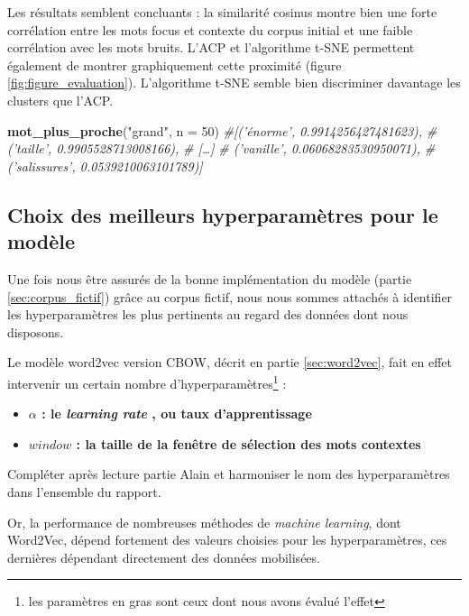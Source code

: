 \documentclass[11pt,french,french]{article}
\newenvironment{Shaded}{\begin{snugshade}}{\end{snugshade}}
\newcommand{\CommentTok}[1]{\textcolor[rgb]{0.56,0.35,0.01}{\textit{#1}}}
\newcommand{\DataTypeTok}[1]{\textcolor[rgb]{0.13,0.29,0.53}{#1}}
\newcommand{\DecValTok}[1]{\textcolor[rgb]{0.00,0.00,0.81}{#1}}
\newcommand{\KeywordTok}[1]{\textcolor[rgb]{0.13,0.29,0.53}{\textbf{#1}}}
\newcommand{\NormalTok}[1]{#1}
\newcommand{\StringTok}[1]{\textcolor[rgb]{0.31,0.60,0.02}{#1}}
\let\rmarkdownfootnote\footnote%
\def\footnote{\protect\rmarkdownfootnote}
\begin{document}
Les résultats semblent concluants : la similarité cosinus montre bien
une forte corrélation entre les mots focus et contexte du corpus initial
et une faible corrélation avec les mots bruits. L'ACP et l'algorithme
t-SNE permettent également de montrer graphiquement cette proximité
(figure \ref{fig:figure_evaluation}). L'algorithme t-SNE semble bien
discriminer davantage les clusters que l'ACP.

\begin{Shaded}
\begin{Highlighting}[]
\KeywordTok{mot_plus_proche}\NormalTok{(}\StringTok{"grand"}\NormalTok{, }\DataTypeTok{n =} \DecValTok{50}\NormalTok{)}
\CommentTok{#[('énorme', 0.9914256427481623),}
\CommentTok{# ('taille', 0.9905528713008166),}
\CommentTok{# […]}
\CommentTok{# ('vanille', 0.06068283530950071),}
\CommentTok{# ('salissures', 0.0539210063101789)]}
\end{Highlighting}
\end{Shaded}

\hypertarget{choix-des-meilleurs-hyperparamuxe8tres-pour-le-moduxe8le}{%
\subsection{Choix des meilleurs hyperparamètres pour le
modèle}\label{choix-des-meilleurs-hyperparamuxe8tres-pour-le-moduxe8le}}

Une fois nous être assurés de la bonne implémentation du modèle (partie
\ref{sec:corpus_fictif}) grâce au corpus fictif, nous nous sommes
attachés à identifier les hyperparamètres les plus pertinents au regard
des données dont nous disposons.

Le modèle word2vec version CBOW, décrit en partie \ref{sec:word2vec},
fait en effet intervenir un certain nombre d'hyperparamètres\footnote{les
  paramètres en gras sont ceux dont nous avons évalué l'effet} :

\begin{itemize}
\item \textbf{$\alpha$ : le \og \emph{learning rate} \fg, ou taux d'apprentissage}
\item \textbf{$window$ : la taille de la fenêtre de sélection des mots contextes}
\end{itemize}

\colorbox{BurntOrange}{Compléter après lecture partie Alain et harmoniser le nom des hyperparamètres dans l'ensemble du rapport.}

Or, la performance de nombreuses méthodes de \emph{machine learning},
dont Word2Vec, dépend fortement des valeurs choisies pour les
hyperparamètres, ces dernières dépendant directement des données
mobilisées.
\end{document}
